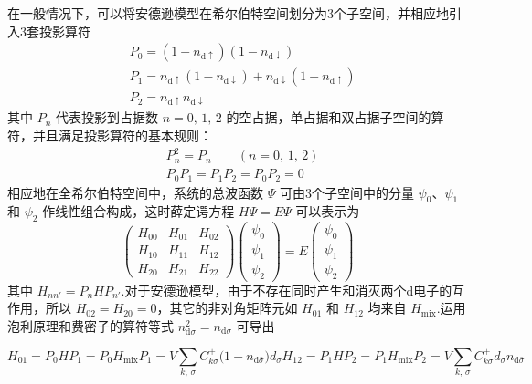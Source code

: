 在一般情况下，可以将安德逊模型在希尔伯特空间划分为3个子空间，并相应地引入3套投影算符
\begin{equation}
\begin{aligned}
  &P_{0}=(1-n_{\mathrm{d}\uparrow})(1-n_{\mathrm{d}\downarrow})\\
  &P_{1}=n_{\mathrm{d}\uparrow}(1-n_{\mathrm{d}\downarrow})
  +n_{\mathrm{d}\downarrow}(1-n_{\mathrm{d}\uparrow})\\
  &P_{2}=n_{\mathrm{d}\uparrow}n_{\mathrm{d}\downarrow}
\end{aligned}
\end{equation}
其中 $P_{n}$ 代表投影到占据数 $n=0,\,1,\,2$ 的空占据，单占据和双占据子空间的算符，并且满足投影算符的基本规则：
\begin{equation*}
\begin{aligned}
  &P^{2}_{n}=P_{n}\qquad(n=0,\,1,\,2)\\
  &P_{0}P_{1}=P_{1}P_{2}=P_{0}P_{2}=0
\end{aligned}
\end{equation*}
相应地在全希尔伯特空间中，系统的总波函数 $\varPsi$ 可由3个子空间中的分量 $\psi_{0}$、$\psi_{1}$ 和 $\psi_{2}$ 作线性组合构成，这时薛定谔方程 $H\varPsi=E\varPsi$ 可以表示为
\begin{equation}
  \begin{pmatrix}
    H_{00}&H_{01}&H_{02}\\
    H_{10}&H_{11}&H_{12}\\
    H_{20}&H_{21}&H_{22}
  \end{pmatrix}
  \begin{pmatrix}\psi_{0}\\\psi_{1}\\\psi_{2}\end{pmatrix}
  =E\begin{pmatrix}\psi_{0}\\\psi_{1}\\\psi_{2}\end{pmatrix}
\end{equation}
其中 $H_{nn'}=P_{n}HP_{n'}$.对于安德逊模型，由于不存在同时产生和消灭两个d电子的互作用，所以 $H_{02}=H_{20}=0$，其它的非对角矩阵元如 $H_{01}$ 和 $H_{12}$ 均来自 $H_{\mathrm{mix}}$.运用泡利原理和费密子的算符等式 $n^{2}_{\mathrm{d}\sigma}=n_{\mathrm{d}\sigma}$ 可导出

\begin{subequations}
\begin{equation}
  H_{01}=P_{0}HP_{1}=P_{0}H_{\mathrm{mix}}P_{1}
  =V\sum_{k,\,\sigma}C^{+}_{k\sigma}
  \bigl(1-n_{\mathrm{d}\bar{\sigma}}\bigr)d_{\sigma}
\end{equation}
\begin{equation}
  H_{12}=P_{1}HP_{2}=P_{1}H_{\mathrm{mix}}P_{2}
  =V\sum_{k,\,\sigma}C^{+}_{k\sigma}d_{\sigma}n_{\mathrm{d}\bar{\sigma}}
\end{equation}
\end{subequations}

